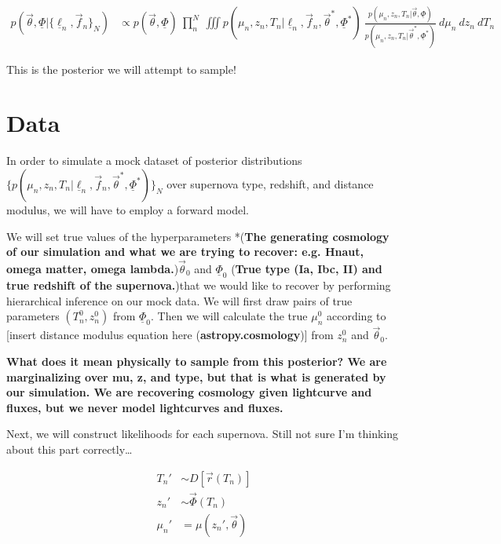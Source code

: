 \documentclass[12pt, onecolumn]{emulateapj}
\newcommand{\textul}{\underline}
\begin{document}
\begin{align}
p(\vec{\theta}, \textul{\Phi} | \{\textul{\ell}_{n}, \vec{f}_{n}\}_{N}) &\propto p(\vec{\theta}, \textul{\Phi})\ \prod_{n}^{N}\ \iiint p(\mu_{n}, z_{n}, T_{n} | \textul{\ell}_{n}, \vec{f}_{n}, \vec{\theta}^{*}, \textul{\Phi}^{*})\ \frac{p(\mu_{n}, z_{n}, T_{n} | \vec{\theta}, \textul{\Phi})}{p(\mu_{n}, z_{n}, T_{n} | \vec{\theta}^{*}, \textul{\Phi}^{*})}\ d\mu_{n}\ dz_{n}\ dT_{n}
\end{align}

This is the posterior we will attempt to sample!

\section{Data}
\label{sec:data}

In order to simulate a mock dataset of posterior distributions $\{p(\mu_{n}, z_{n}, T_{n} | \textul{\ell}_{n}, \vec{f}_{n}, \vec{\theta}^{*}, \textul{\Phi}^{*})\}_{N}$ over supernova type, redshift, and distance modulus, we will have to employ a forward model.

We will set true values of the hyperparameters *({\bf The generating cosmology of our simulation and what we are trying to recover: e.g. Hnaut, omega matter, omega lambda.})$\vec{\theta}_{0}$ and $\textul{\Phi}_{0}$ ({\bf True type (Ia, Ibc, II) and true redshift of the supernova.})that we would like to recover by performing hierarchical inference on our mock data.  We will first draw pairs of true parameters $(T_{n}^{0}, z_{n}^{0})$ from $\textul{\Phi}_{0}$.  Then we will calculate the true $\mu_{n}^{0}$ according to [insert distance modulus equation here ({\bf astropy.cosmology})] from $z_{n}^{0}$ and $\vec{\theta}_{0}$.

{\bf What does it mean physically to sample from this posterior?  We are marginalizing over mu, z, and type, but that is what is generated by our simulation. We are recovering cosmology given lightcurve and fluxes, but we never model lightcurves and fluxes.}

Next, we will construct likelihoods for each supernova.  Still not sure I'm thinking about this part correctly\dots

\begin{align}
T_{n}' &\sim D[\vec{r}(T_{n})]\\
z_{n}' &\sim \vec{\Phi}(T_{n})\\
\mu_{n}' &= \mu(z_{n}', \vec{\theta})
\end{align}




\end{document}
